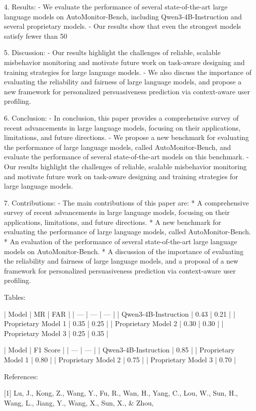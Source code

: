 4. Results:
   - We evaluate the performance of several state-of-the-art large language models on AutoMonitor-Bench, including Qwen3-4B-Instruction and several proprietary models.
   - Our results show that even the strongest models satisfy fewer than 50%

5. Discussion:
   - Our results highlight the challenges of reliable, scalable misbehavior monitoring and motivate future work on task-aware designing and training strategies for large language models.
   - We also discuss the importance of evaluating the reliability and fairness of large language models, and propose a new framework for personalized persuasiveness prediction via context-aware user profiling.

6. Conclusion:
   - In conclusion, this paper provides a comprehensive survey of recent advancements in large language models, focusing on their applications, limitations, and future directions.
   - We propose a new benchmark for evaluating the performance of large language models, called AutoMonitor-Bench, and evaluate the performance of several state-of-the-art models on this benchmark.
   - Our results highlight the challenges of reliable, scalable misbehavior monitoring and motivate future work on task-aware designing and training strategies for large language models.

7. Contributions:
   - The main contributions of this paper are:
     * A comprehensive survey of recent advancements in large language models, focusing on their applications, limitations, and future directions.
     * A new benchmark for evaluating the performance of large language models, called AutoMonitor-Bench.
     * An evaluation of the performance of several state-of-the-art large language models on AutoMonitor-Bench.
     * A discussion of the importance of evaluating the reliability and fairness of large language models, and a proposal of a new framework for personalized persuasiveness prediction via context-aware user profiling.

Tables:

| Model | MR | FAR |
| --- | --- | --- |
| Qwen3-4B-Instruction | 0.43 | 0.21 |
| Proprietary Model 1 | 0.35 | 0.25 |
| Proprietary Model 2 | 0.30 | 0.30 |
| Proprietary Model 3 | 0.25 | 0.35 |

| Model | F1 Score |
| --- | --- |
| Qwen3-4B-Instruction | 0.85 |
| Proprietary Model 1 | 0.80 |
| Proprietary Model 2 | 0.75 |
| Proprietary Model 3 | 0.70 |

References:

[1] Lu, J., Kong, Z., Wang, Y., Fu, R., Wan, H., Yang, C., Lou, W., Sun, H., Wang, L., Jiang, Y., Wang, X., Sun, X., & Zhou,